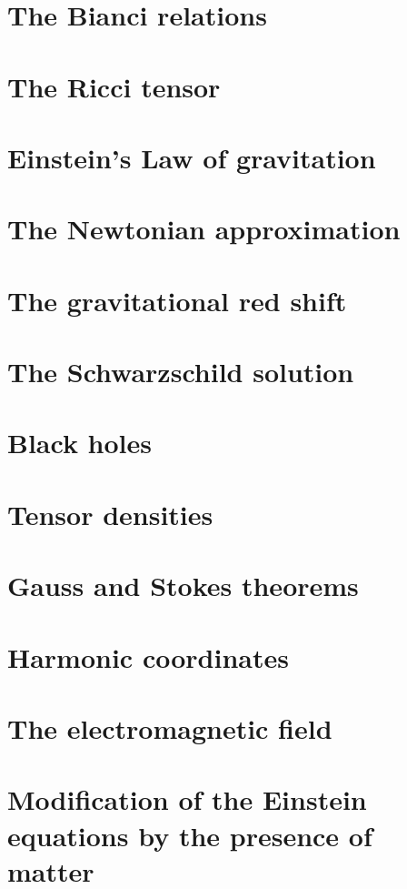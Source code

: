 \documentclass[12pt]{article}
\numberwithin{equation}{section}
\begin{document}
\section{The Bianci relations}

\section{The Ricci tensor}

\section{Einstein's Law of gravitation}

\section{The Newtonian approximation}

\section{The gravitational red shift}

\section{The Schwarzschild solution}

\section{Black holes}

\section{Tensor densities}

\section{Gauss and Stokes theorems}

\section{Harmonic coordinates}

\section{The electromagnetic field}

\section{Modification of the Einstein equations by the presence of matter}

\end{document}
